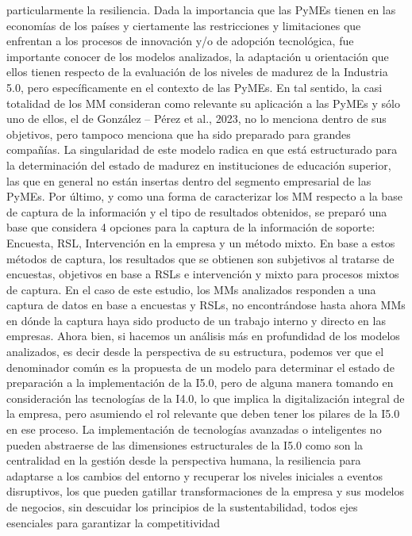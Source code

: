 \documentclass{article}
\begin{document}
particularmente la resiliencia. Dada la importancia que las PyMEs tienen
en las economías de los países y ciertamente las restricciones y
limitaciones que enfrentan a los procesos de innovación y/o de adopción
tecnológica, fue importante conocer de los modelos analizados, la
adaptación u orientación que ellos tienen respecto de la evaluación de
los niveles de madurez de la Industria 5.0, pero específicamente en el
contexto de las PyMEs. En tal sentido, la casi totalidad de los MM
consideran como relevante su aplicación a las PyMEs y sólo uno de ellos,
el de González -- Pérez et al., 2023, no lo menciona dentro de sus
objetivos, pero tampoco menciona que ha sido preparado para grandes
compañías. La singularidad de este modelo radica en que está
estructurado para la determinación del estado de madurez en
instituciones de educación superior, las que en general no están
insertas dentro del segmento empresarial de las PyMEs. Por último, y
como una forma de caracterizar los MM respecto a la base de captura de
la información y el tipo de resultados obtenidos, se preparó una base
que considera 4 opciones para la captura de la información de soporte:
Encuesta, RSL, Intervención en la empresa y un método mixto. En base a
estos métodos de captura, los resultados que se obtienen son subjetivos
al tratarse de encuestas, objetivos en base a RSLs e intervención y
mixto para procesos mixtos de captura. En el caso de este estudio, los
MMs analizados responden a una captura de datos en base a encuestas y
RSLs, no encontrándose hasta ahora MMs en dónde la captura haya sido
producto de un trabajo interno y directo en las empresas. Ahora bien, si
hacemos un análisis más en profundidad de los modelos analizados, es
decir desde la perspectiva de su estructura, podemos ver que el
denominador común es la propuesta de un modelo para determinar el estado
de preparación a la implementación de la I5.0, pero de alguna manera
tomando en consideración las tecnologías de la I4.0, lo que implica la
digitalización integral de la empresa, pero asumiendo el rol relevante
que deben tener los pilares de la I5.0 en ese proceso. La implementación
de tecnologías avanzadas o inteligentes no pueden abstraerse de las
dimensiones estructurales de la I5.0 como son la centralidad en la
gestión desde la perspectiva humana, la resiliencia para adaptarse a los
cambios del entorno y recuperar los niveles iniciales a eventos
disruptivos, los que pueden gatillar transformaciones de la empresa y
sus modelos de negocios, sin descuidar los principios de la
sustentabilidad, todos ejes esenciales para garantizar la competitividad
\end{document}
